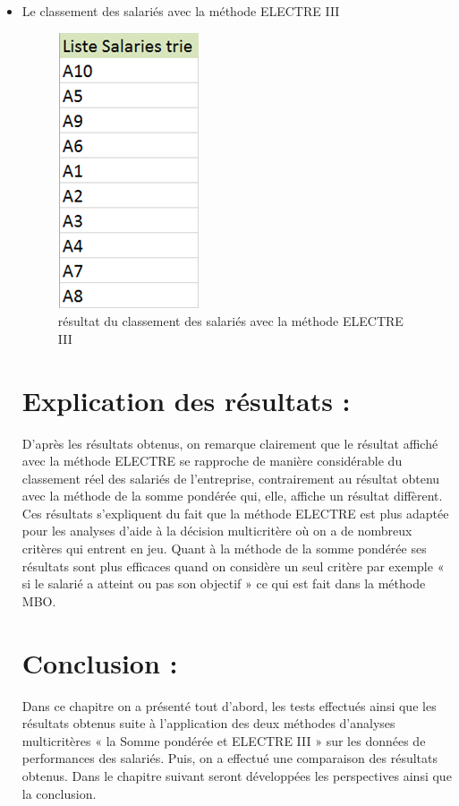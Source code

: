 \begin{itemize}
\item Le classement des salariés avec la méthode ELECTRE III
\begin{figure}[!h]
\begin{center}
\includegraphics{Tests_resultats/classement_electre.png}
\end{center}
\caption{résultat du classement des salariés avec la méthode ELECTRE III}
\end{figure}

\section{Explication des résultats :}
D’après les résultats obtenus, on remarque clairement que le résultat affiché avec la méthode ELECTRE se rapproche de manière considérable du classement réel des salariés de l’entreprise, contrairement au résultat obtenu avec la méthode de la somme pondérée qui, elle, affiche un résultat diffèrent.\\
Ces résultats s’expliquent du fait que la méthode ELECTRE est plus adaptée pour les analyses d’aide à la décision multicritère où on a de nombreux critères qui entrent en jeu. Quant à la méthode de la somme pondérée ses résultats sont plus efficaces quand on considère un seul critère par exemple « si le salarié a atteint ou pas son objectif » ce qui est fait dans la méthode MBO. 


\section{Conclusion :}
Dans ce chapitre on a présenté tout d’abord, les tests effectués ainsi que les résultats obtenus suite à l’application des deux méthodes d’analyses multicritères « la Somme pondérée et ELECTRE III » sur les données de performances des salariés. Puis, on a effectué une comparaison des résultats obtenus. Dans le chapitre suivant seront développées les perspectives ainsi que la conclusion.
\end{itemize}
